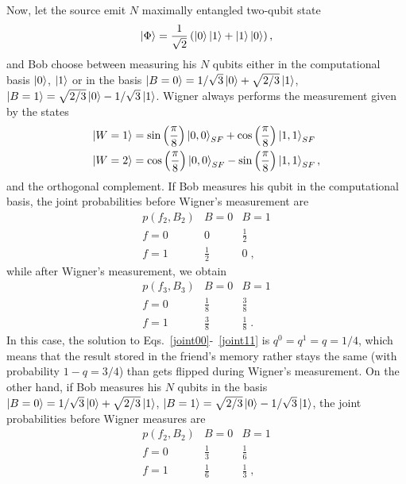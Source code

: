 \documentclass[a4paper,twocolumn,11pt,accepted=2017-05-09,dvipsnames]{quantumarticle}
\numberwithin{equation}{section}
\begin{document}
Now, let the source emit $N$ maximally entangled two-qubit state
\begin{align}
\label{initial_state}
\ket{\Phi}=\frac{1}{\sqrt{2}}\left( \ket{0}\ket{1}+\ket{1}\ket{0} \right),
\end{align}
and Bob choose between measuring his $N$ qubits either in the computational basis $\ket{0}$, $\ket{1}$ or in the basis $\ket{B=0}=1/\sqrt{3}\ket{0}+\sqrt{2/3}\ket{1}$, $\ket{B=1}=\sqrt{2/3}\ket{0} - 1/\sqrt{3}\ket{1}$. Wigner always performs the measurement given by the states
\begin{align}
\label{Wigner_msm}
\ket{W=1}&= \sin\left( \frac{\pi}{8}\right)\ket{0,0}_{SF}+  \cos\left( \frac{\pi}{8}\right) \ket{1,1}_{SF} \\
\ket{W=2}&= \cos\left( \frac{\pi}{8}\right) \ket{0,0}_{SF} -  \sin\left( \frac{\pi}{8}\right)  \ket{1,1}_{SF},
\end{align}
and the orthogonal complement. If Bob measures his qubit in the computational basis, the joint probabilities before Wigner's measurement are 
\begin{equation*}
\renewcommand{\arraystretch}{1.25}
  \begin{array}{c|c|c}
  p(f_2,B_2)  & B=0 & B=1 \\  [0.25em]  \hline
  f= 0 & 0 & \frac{1}{2}  \\[0.25em]
   f= 1 &  \frac{1}{2} & 0 \;,
  \end{array}
\end{equation*}
while after Wigner's measurement, we obtain
\begin{equation*}
\renewcommand{\arraystretch}{1.25}
  \begin{array}{c|c|c}
  p(f_3,B_3)  & B=0 & B=1 \\  [0.25em]  \hline
  f= 0 & \frac{1}{8} & \frac{3}{8}  \\[0.25em]
   f= 1 &  \frac{3}{8} & \frac{1}{8} \;.
  \end{array}
\end{equation*}
In this case, the solution to Eqs.~\eqref{joint00}-~\eqref{joint11} is $q^0=q^1=q=1/4$, which means that the result stored in the friend's memory rather stays the same (with probability $1-q=3/4$) than gets flipped during Wigner's measurement. On the other hand, if Bob measures his $N$ qubits in the basis $\ket{B=0}=1/\sqrt{3}\ket{0}+\sqrt{2/3}\ket{1}$, $\ket{B=1}=\sqrt{2/3}\ket{0} - 1/\sqrt{3}\ket{1}$, the joint probabilities before Wigner measures are
\begin{equation*}
\renewcommand{\arraystretch}{1.25}
  \begin{array}{c|c|c}
  p(f_2,B_2)  & B=0 & B=1 \\  [0.25em]  \hline
  f= 0 & \frac{1}{3} & \frac{1}{6}  \\[0.25em]
   f= 1 &  \frac{1}{6} & \frac{1}{3} \;,
  \end{array}
\end{equation*}
\end{document}
